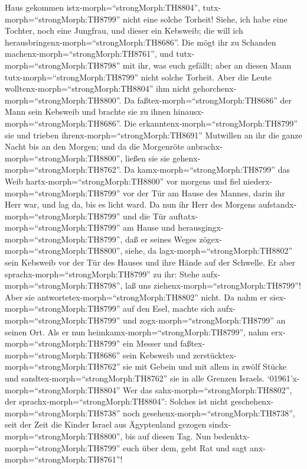 Haus gekommen istx-morph=``strongMorph:TH8804'',
tutx-morph=``strongMorph:TH8799'' nicht eine solche Torheit!
 Siehe, ich habe eine Tochter, noch eine Jungfrau, und
dieser ein Kebsweib; die will ich
herausbringenx-morph=``strongMorph:TH8686''. Die mögt ihr zu Schanden
machenx-morph=``strongMorph:TH8761'', und
tutx-morph=``strongMorph:TH8798'' mit ihr, was euch gefällt; aber an
diesen Mann tutx-morph=``strongMorph:TH8799'' nicht solche Torheit.
 Aber die Leute wolltenx-morph=``strongMorph:TH8804'' ihm
nicht gehorchenx-morph=``strongMorph:TH8800''. Da
faßtex-morph=``strongMorph:TH8686'' der Mann sein Kebsweib und brachte
sie zu ihnen hinausx-morph=``strongMorph:TH8686''. Die
erkanntenx-morph=``strongMorph:TH8799'' sie und trieben
ihrenx-morph=``strongMorph:TH8691'' Mutwillen an ihr die ganze Nacht bis
an den Morgen; und da die Morgenröte
anbrachx-morph=``strongMorph:TH8800'', ließen sie sie
gehenx-morph=``strongMorph:TH8762''.  Da
kamx-morph=``strongMorph:TH8799'' das Weib
hartx-morph=``strongMorph:TH8800'' vor morgens und fiel
niederx-morph=``strongMorph:TH8799'' vor der Tür am Hause des Mannes,
darin ihr Herr war, und lag da, bis es licht ward.  Da nun
ihr Herr des Morgens aufstandx-morph=``strongMorph:TH8799'' und die Tür
auftatx-morph=``strongMorph:TH8799'' am Hause und
herausgingx-morph=``strongMorph:TH8799'', daß er seines Weges
zögex-morph=``strongMorph:TH8800'', siehe, da
lagx-morph=``strongMorph:TH8802'' sein Kebsweib vor der Tür des Hauses
und ihre Hände auf der Schwelle.  Er aber
sprachx-morph=``strongMorph:TH8799'' zu ihr: Stehe
aufx-morph=``strongMorph:TH8798'', laß uns
ziehenx-morph=``strongMorph:TH8799''! Aber sie
antwortetex-morph=``strongMorph:TH8802'' nicht. Da nahm er
siex-morph=``strongMorph:TH8799'' auf den Esel, machte sich
aufx-morph=``strongMorph:TH8799'' und zogx-morph=``strongMorph:TH8799''
an seinen Ort.  Als er nun
heimkamx-morph=``strongMorph:TH8799'', nahm
erx-morph=``strongMorph:TH8799'' ein Messer und
faßtex-morph=``strongMorph:TH8686'' sein Kebsweib und
zerstücktex-morph=``strongMorph:TH8762'' sie mit Gebein und mit allem in
zwölf Stücke und sandtex-morph=``strongMorph:TH8762'' sie in alle
Grenzen Israels. 
`01961'\textbar x-morph=``strongMorph:TH8804'' Wer das
sahx-morph=``strongMorph:TH8802'', der
sprachx-morph=``strongMorph:TH8804'': Solches ist nicht
geschehenx-morph=``strongMorph:TH8738'' noch
gesehenx-morph=``strongMorph:TH8738'', seit der Zeit die Kinder Israel
aus Ägyptenland gezogen sindx-morph=``strongMorph:TH8800'', bis auf
diesen Tag. Nun bedenktx-morph=``strongMorph:TH8799'' euch über dem,
gebt Rat und sagt anx-morph=``strongMorph:TH8761''!

